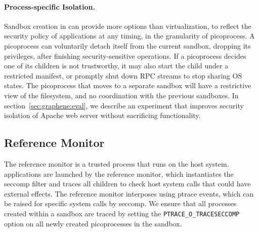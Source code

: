 \paragraph{Process-specific Isolation.} 
Sandbox creation in \graphene{} can provide
more options than virtualization, to reflect the security policy of applications at any timing,
in the granularity of picoprocess. 
A picoprocess can voluntarily detach itself from the current sandbox, dropping its privileges,
after finishing security-sensitive operations.
If a picoprocess decides one of its children is not trustworthy, it may also start the child under a restricted manifest,
or promptly shut down RPC streams to stop sharing OS states.
The picoprocess that moves to a separate sandbox will have a restrictive view of the filesystem, and no coordination with the previous sandboxes.
In section~\ref{sec:graphene:eval}, we describe an experiment that improves security isolation of Apache web server without sacrificing functionality.

\subsection{Reference Monitor}
\label{sec:graphene:security:monitor}

The reference monitor is a trusted process that runs on the host system.
\graphene{} applications are launched by the reference monitor,
which instantiates the seccomp filter and traces all children
to check host system calls that could have external effects.
The reference monitor interposes using ptrace events, 
which can be raised for specific system calls by seccomp.
We ensure that all processes created within a sandbox are traced
by setting the {\tt PTRACE\_O\_TRACESECCOMP} option on all newly created picoprocesses
in the sandbox.


